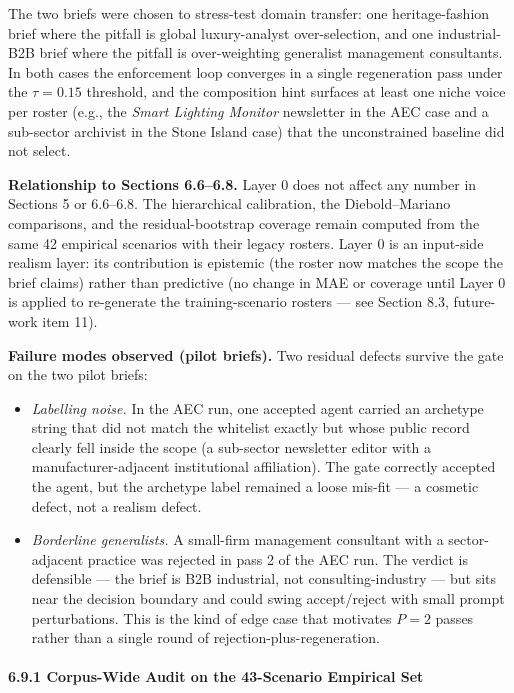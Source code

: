 \documentclass[
]{article}
\providecommand{\tightlist}{%
  \setlength{\itemsep}{0pt}\setlength{\parskip}{0pt}}
\begin{document}
The two briefs were chosen to stress-test domain transfer: one
heritage-fashion brief where the pitfall is global luxury-analyst
over-selection, and one industrial-B2B brief where the pitfall is
over-weighting generalist management consultants. In both cases the
enforcement loop converges in a single regeneration pass under the
\(\tau = 0.15\) threshold, and the composition hint surfaces at least
one niche voice per roster (e.g., the \emph{Smart Lighting Monitor}
newsletter in the AEC case and a sub-sector archivist in the Stone
Island case) that the unconstrained baseline did not select.

\textbf{Relationship to Sections 6.6--6.8.} Layer 0 does not affect any
number in Sections 5 or 6.6--6.8. The hierarchical calibration, the
Diebold--Mariano comparisons, and the residual-bootstrap coverage remain
computed from the same 42 empirical scenarios with their legacy rosters.
Layer 0 is an input-side realism layer: its contribution is epistemic
(the roster now matches the scope the brief claims) rather than
predictive (no change in MAE or coverage until Layer 0 is applied to
re-generate the training-scenario rosters --- see Section 8.3,
future-work item 11).

\textbf{Failure modes observed (pilot briefs).} Two residual defects
survive the gate on the two pilot briefs:

\begin{itemize}
\tightlist
\item
  \emph{Labelling noise.} In the AEC run, one accepted agent carried an
  archetype string that did not match the whitelist exactly but whose
  public record clearly fell inside the scope (a sub-sector newsletter
  editor with a manufacturer-adjacent institutional affiliation). The
  gate correctly accepted the agent, but the archetype label remained a
  loose mis-fit --- a cosmetic defect, not a realism defect.
\item
  \emph{Borderline generalists.} A small-firm management consultant with
  a sector-adjacent practice was rejected in pass 2 of the AEC run. The
  verdict is defensible --- the brief is B2B industrial, not
  consulting-industry --- but sits near the decision boundary and could
  swing accept/reject with small prompt perturbations. This is the kind
  of edge case that motivates \(P = 2\) passes rather than a single
  round of rejection-plus-regeneration.
\end{itemize}

\paragraph{6.9.1 Corpus-Wide Audit on the 43-Scenario Empirical
Set}\label{corpus-wide-audit-on-the-43-scenario-empirical-set}
\end{document}
